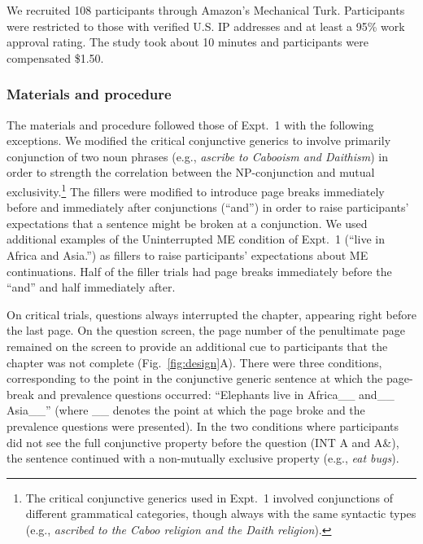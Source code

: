 \documentclass[10pt,letterpaper]{article}
\begin{document}
We recruited 108 participants through Amazon's Mechanical Turk.
Participants were restricted to those with verified U.S. IP addresses and at least a 95\% work approval rating. 
The study took about 10 minutes and participants were compensated \$1.50.

\subsubsection{Materials and procedure}

The materials and procedure  followed those of Expt.~1 with the following exceptions.
We modified the critical conjunctive generics to involve primarily conjunction of two noun phrases (e.g., \emph{ascribe to Cabooism and Daithism}) in order to strength the correlation between the NP-conjunction and mutual exclusivity.\footnote{
The critical conjunctive generics used in Expt.~1 involved conjunctions of different grammatical categories, though always with the same syntactic types (e.g., \emph{ascribed to the Caboo religion and the Daith religion}).
}
The fillers were modified to introduce page breaks immediately before and immediately after conjunctions (``and'') in order to raise participants' expectations that a sentence might be broken at a conjunction.
We used additional examples of the Uninterrupted ME condition of Expt.~1 (``live in Africa and Asia.'') as fillers to raise participants' expectations about ME continuations.
Half of the filler trials had page breaks immediately before the ``and'' and half immediately after.

On critical trials, questions always interrupted the chapter, appearing right before the last page.
On the question screen, the page number of the penultimate page remained on the screen to provide an additional cue to participants that the chapter was not complete (Fig.~\ref{fig:design}A).
There were three conditions, corresponding to the point in the conjunctive generic sentence at which the page-break and prevalence questions occurred: ``Elephants live in Africa\_\_ and\_\_ Asia\_\_'' (where \_\_ denotes the point at which the page broke and the prevalence questions were presented).
In the two conditions where participants did not see the full conjunctive property before the question (INT A and A\&), the sentence continued with a non-mutually exclusive property (e.g., \emph{eat bugs}). 
\end{document}
